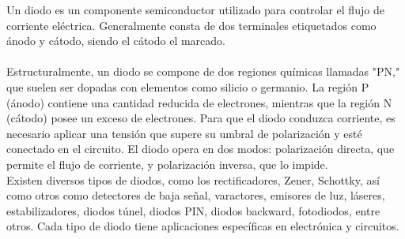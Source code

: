 \documentclass[11pt,fancy,lang=es]{elegantbook}
\begin{document}
Un diodo es un componente semiconductor utilizado para controlar el flujo de corriente eléctrica. Generalmente consta de dos terminales etiquetados como ánodo y cátodo, siendo el cátodo el marcado.\\\\
Estructuralmente, un diodo se compone de dos regiones químicas llamadas "PN," que suelen ser dopadas con elementos como silicio o germanio. La región P (ánodo) contiene una cantidad reducida de electrones, mientras que la región N (cátodo) posee un exceso de electrones. Para que el diodo conduzca corriente, es necesario aplicar una tensión que supere su umbral de polarización y esté conectado en el circuito. El diodo opera en dos modos: polarización directa, que permite el flujo de corriente, y polarización inversa, que lo impide.\\

Existen diversos tipos de diodos, como los rectificadores, Zener, Schottky, así como otros como detectores de baja señal, varactores, emisores de luz, láseres, estabilizadores, diodos túnel, diodos PIN, diodos backward, fotodiodos, entre otros. Cada tipo de diodo tiene aplicaciones específicas en electrónica y circuitos.
\end{document}
